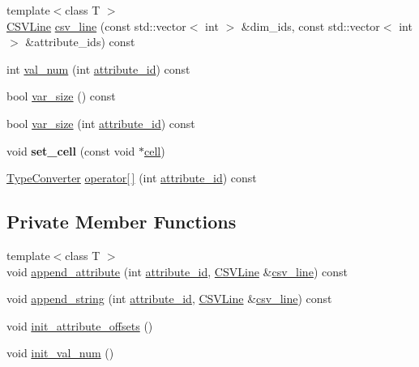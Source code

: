 \begin{DoxyCompactItemize}
\item 
{\footnotesize template$<$class T $>$ }\\\hyperlink{classCSVLine}{C\+S\+V\+Line} \hyperlink{classCell_a337db300c362e1508036edf7d28099b6}{csv\+\_\+line} (const std\+::vector$<$ int $>$ \&dim\+\_\+ids, const std\+::vector$<$ int $>$ \&attribute\+\_\+ids) const 
\item 
int \hyperlink{classCell_a50215499b7edad2593b796efd53d63ac}{val\+\_\+num} (int \hyperlink{classCell_ad07f4719a927282de04d69c8c3d5f45d}{attribute\+\_\+id}) const 
\item 
bool \hyperlink{classCell_a1ce0bc93b8d5f4b018ea6bfe08ec7ddf}{var\+\_\+size} () const 
\item 
bool \hyperlink{classCell_a5a075482f18e19dc6045897942828b82}{var\+\_\+size} (int \hyperlink{classCell_ad07f4719a927282de04d69c8c3d5f45d}{attribute\+\_\+id}) const 
\item 
\hypertarget{classCell_af206d2400b70776df7aadef5a87601b6}{}void {\bfseries set\+\_\+cell} (const void $\ast$\hyperlink{classCell_a1387c431e72e5249686ca153bbe00150}{cell})\label{classCell_af206d2400b70776df7aadef5a87601b6}

\item 
\hyperlink{classTypeConverter}{Type\+Converter} \hyperlink{classCell_a8893e8d102e653edd669eef55994c61f}{operator\mbox{[}$\,$\mbox{]}} (int \hyperlink{classCell_ad07f4719a927282de04d69c8c3d5f45d}{attribute\+\_\+id}) const 
\end{DoxyCompactItemize}
\subsection*{Private Member Functions}
\begin{DoxyCompactItemize}
\item 
{\footnotesize template$<$class T $>$ }\\void \hyperlink{classCell_a96282842c7fb02da03a08ba2438b0627}{append\+\_\+attribute} (int \hyperlink{classCell_ad07f4719a927282de04d69c8c3d5f45d}{attribute\+\_\+id}, \hyperlink{classCSVLine}{C\+S\+V\+Line} \&\hyperlink{classCell_a337db300c362e1508036edf7d28099b6}{csv\+\_\+line}) const 
\item 
void \hyperlink{classCell_a2341c80e242dbe3a61fe7178a62f9c3b}{append\+\_\+string} (int \hyperlink{classCell_ad07f4719a927282de04d69c8c3d5f45d}{attribute\+\_\+id}, \hyperlink{classCSVLine}{C\+S\+V\+Line} \&\hyperlink{classCell_a337db300c362e1508036edf7d28099b6}{csv\+\_\+line}) const 
\item 
void \hyperlink{classCell_acfb7dbc687f4bb09bc1adb109adc19d3}{init\+\_\+attribute\+\_\+offsets} ()
\item 
void \hyperlink{classCell_a747fe44ed4c13e85132696b4eef233b8}{init\+\_\+val\+\_\+num} ()
\end{DoxyCompactItemize}
